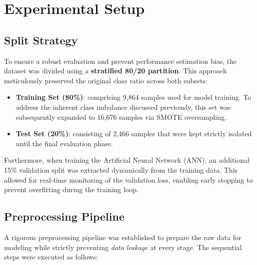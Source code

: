 \section{Experimental Setup}

\subsection{Split Strategy}

To ensure a robust evaluation and prevent performance estimation bias, the dataset was divided using a \textbf{stratified 80/20 partition}. This approach meticulously preserved the original class ratio across both subsets:

\begin{itemize}
    \item \textbf{Training Set (80\%)}: comprising 9,864 samples used for model training. To address the inherent class imbalance discussed previously, this set was subsequently expanded to 16,676 samples via SMOTE oversampling.
    \item \textbf{Test Set (20\%)}: consisting of 2,466 samples that were kept strictly isolated until the final evaluation phase.
\end{itemize}

Furthermore, when training the Artificial Neural Network (ANN), an additional 15\% validation split was extracted dynamically from the training data. This allowed for real-time monitoring of the validation loss, enabling early stopping to prevent overfitting during the training loop.

\subsection{Preprocessing Pipeline}

A rigorous preprocessing pipeline was established to prepare the raw data for modeling while strictly preventing \textit{data leakage} at every stage. The sequential steps were executed as follows:

